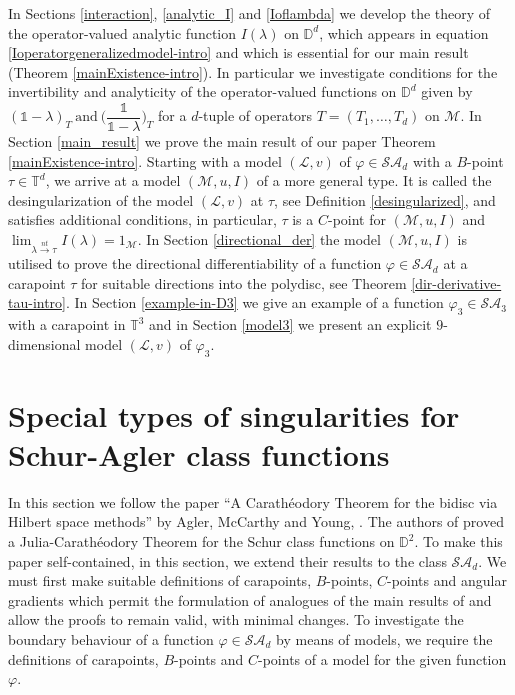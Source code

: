 \documentclass[11pt, reqno]{amsart}
\newcommand\1{\boldsymbol {1}}
\newcommand{\T}{\mathbb{T}}
\newcommand{\ph}{\varphi}
\numberwithin{equation}{section}
\begin{document}
In Sections \ref{interaction}, \ref{analytic_I} and \ref{Ioflambda} we develop the theory of the 
 operator-valued analytic function $I(\lambda)$ on $\mathbb{D}^{d}$, which appears in equation \eqref{Ioperatorgeneralizedmodel-intro} and which is essential for our main result (Theorem \ref{mainExistence-intro}). 
In particular we investigate conditions for the invertibility and analyticity of the operator-valued functions on $\mathbb{D}^{d}$ given by
$(\mathds{1}-\lambda)_{T}~\text{and}~\bigg(\dfrac{\mathds{1}}{\mathds{1}-\lambda}\bigg)_{T}$
for a $d$-tuple of operators $T=(T_{1},\hdots,T_{d})$ on $\mathcal{M}$. 
In Section \ref{main_result} we  prove the main result of our paper Theorem \ref{mainExistence-intro}.  Starting with a model $(\mathcal{L},v)$  of $\varphi\in\mathcal{SA}_{d}$ with a $B$-point $\tau \in \mathbb{T}^d$, we  arrive at a model $(\mathcal{M},u,I)$ of a more general type. It is called the desingularization of the model $(\mathcal{L},v)$ at $\tau$, see Definition \ref{desingularized}, and satisfies  additional conditions, in particular, $\tau$ is a $C$-point for $(\mathcal{M},u,I)$ and $\lim_{\lambda{\overset{nt}\rightarrow}\tau}I(\lambda)=1_{\mathcal{M}}$.
In Section \ref{directional_der} the model $(\mathcal{M},u,I)$ is utilised to prove the directional differentiability of a function $\varphi\in\mathcal{SA}_{d}$ at a carapoint $\tau$ for suitable directions into the polydisc, see Theorem \ref{dir-derivative-tau-intro}.
In Section \ref{example-in-D3} we give an example of a function $\ph_3\in\mathcal{SA}_{3}$
with a carapoint in $\T^3$ and in Section \ref{model3} we
present an explicit $9$-dimensional model $(\mathcal{L},v)$ of $\ph_3$.


\section{Special types of singularities for Schur-Agler class functions}\label{caratheodory_section}
In this section we follow the paper ``A Carath\'{e}odory Theorem for the bidisc via Hilbert space methods'' by Agler, McCarthy and Young, \cite{AMYcara}. The authors of \cite{AMYcara} proved a Julia-Carath\'{e}odory Theorem for the Schur class functions on $\mathbb{D}^{2}$.  To make this paper self-contained, in this section, we extend their results to the class $\mathcal{SA}_{d}$. We must first make suitable definitions of carapoints, $B$-points, $C$-points and angular gradients which permit the formulation of analogues of the main results of \cite{AMYcara} and allow the proofs to remain valid, with minimal changes. To investigate the boundary behaviour of a function $\varphi\in\mathcal{SA}_{d}$ by means of models, we require the definitions of carapoints, $B$-points and $C$-points of a model for the given  function $\varphi$.
\end{document}
